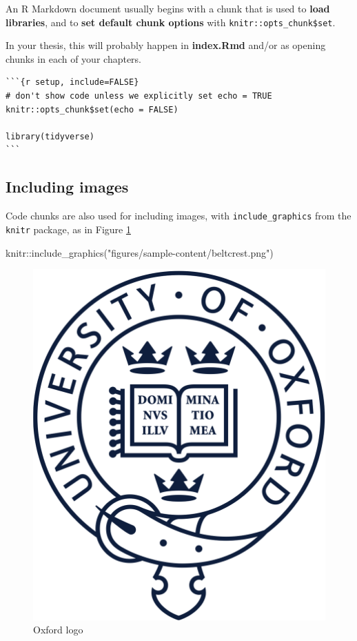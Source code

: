 \documentclass[a4paper, nobind]{templates/ociamthesis}
\newenvironment{Shaded}{\begin{snugshade}}{\end{snugshade}}
\newcommand{\FunctionTok}[1]{\textcolor[rgb]{0.00,0.00,0.00}{#1}}
\newcommand{\NormalTok}[1]{#1}
\newcommand{\SpecialCharTok}[1]{\textcolor[rgb]{0.00,0.00,0.00}{#1}}
\newcommand{\StringTok}[1]{\textcolor[rgb]{0.31,0.60,0.02}{#1}}
\renewenvironment{Shaded}
{
  \vspace{10pt}%
  \begin{snugshade}%
}{%
  \end{snugshade}%
  \vspace{8pt}%
}
\begin{document}
An R Markdown document usually begins with a chunk that is used to \textbf{load libraries}, and to \textbf{set default chunk options} with \texttt{knitr::opts\_chunk\$set}.

In your thesis, this will probably happen in \textbf{index.Rmd} and/or as opening chunks in each of your chapters.

\begin{verbatim}
```{r setup, include=FALSE}
# don't show code unless we explicitly set echo = TRUE
knitr::opts_chunk$set(echo = FALSE)

library(tidyverse)
```
\end{verbatim}

\hypertarget{including-images}{%
\subsection{Including images}\label{including-images}}

Code chunks are also used for including images, with \texttt{include\_graphics} from the \texttt{knitr} package, as in Figure \ref{fig:oxford-logo}

\begin{Shaded}
\begin{Highlighting}[]
\NormalTok{knitr}\SpecialCharTok{::}\FunctionTok{include\_graphics}\NormalTok{(}\StringTok{"figures/sample{-}content/beltcrest.png"}\NormalTok{)}
\end{Highlighting}
\end{Shaded}

\begin{figure}

{\centering \includegraphics[width=0.5\linewidth]{figures/sample-content/beltcrest} 

}

\caption{Oxford logo}\label{fig:oxford-logo}
\end{figure}
\end{document}
